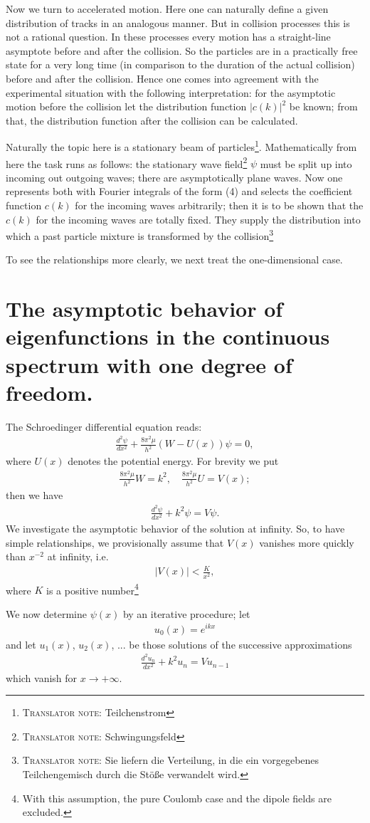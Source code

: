 \documentclass[a4paper,11pt]{article}
\newcommand{\?}[2]{#1\footnote{\textsc{Translator note}: #2}}
\newcommand{\nequ}[2]{\begin{align*}\tag{#1}#2\end{align*}}
\newcommand{\uequ}[1]{\begin{align*}#1\end{align*}}
\renewcommand{\exp}[1]{e^{#1}}
\begin{document}
Now we turn to accelerated motion. Here one can naturally define a given distribution of tracks in an analogous manner. But in collision processes this is not a rational question. In these processes every motion has a straight-line asymptote before and after the collision. So the particles are in a practically free state for a very long time (in comparison to the duration of the actual collision) before and after the collision. Hence one comes into agreement with the experimental situation with the following interpretation: for the asymptotic motion before the collision let the distribution function $|c(k)|^2$ be known; from that, the distribution function after the collision can be calculated.

Naturally the topic here is a stationary \?{beam of particles}{Teilchenstrom}. Mathematically from here the task runs as follows: the stationary \?{wave field}{Schwingungsfeld} $\psi$ must be split up into incoming out outgoing waves; there are asymptotically plane waves. Now one represents both with Fourier integrals of the form (4) and selects the coefficient function $c(k)$ for the incoming waves arbitrarily; then it is to be shown that the $c(k)$ for the incoming waves are totally fixed. \?{They supply the distribution
into which a past particle mixture is transformed by the collision}{Sie liefern die Verteilung, in die ein vorgegebenes Teilchengemisch durch die Stöße verwandelt wird.}

To see the relationships more clearly, we next treat the one-dimensional case.

\section{The asymptotic behavior of eigenfunctions in the continuous spectrum with one degree of freedom.} The Schroedinger differential equation reads:
\nequ{1}{
\frac{d^2\psi}{dx^2} + \frac{8\pi^2\mu}{h^2}\left(W-U(x)\right)\psi=0,
}
where $U(x)$ denotes the potential energy. For brevity we put
\nequ{2}{
\frac{8\pi^2\mu}{h^2}W = k^2,\quad
\frac{8\pi^2\mu}{h^2}U= V(x);
}
then we have
\nequ{3}{\frac{d^2\psi}{dx^2}+k^2\psi = V\psi.}
We investigate the asymptotic behavior of the solution at infinity. So, to have simple relationships, we provisionally assume that $V(x)$ vanishes more quickly than $x^{-2}$ at infinity, i.e.
\nequ{4}{\left|V(x)\right|<\frac{K}{x^2},}
where $K$ is a positive number\footnote{With this assumption, the pure Coulomb case and the dipole fields are excluded.}

We now determine $\psi(x)$ by an iterative procedure; let
\nequ{5}{u_0(x) = \exp{ikx}}
and let $u_1(x)$, $u_2(x)$, ... be those solutions of the successive approximations
\uequ{
\frac{d^2 u_n}{dx^2}+k^2 u_n = V u_{n-1}
}
which vanish for $x\to+\infty$.
\end{document}
